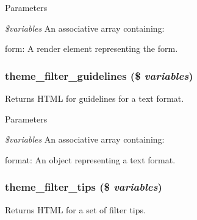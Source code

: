 \begin{DoxyParams}{Parameters}
\item[{\em \$variables}]An associative array containing:
\begin{DoxyItemize}
\item form: A render element representing the form. 
\end{DoxyItemize}\end{DoxyParams}
\hypertarget{group__themeable_ga1c1be7f8ecbe9bff3d03674a3c4e50ed}{
\subsubsection[{theme\_\-filter\_\-guidelines}]{\setlength{\rightskip}{0pt plus 5cm}theme\_\-filter\_\-guidelines (\$ {\em variables})}}
\label{group__themeable_ga1c1be7f8ecbe9bff3d03674a3c4e50ed}
Returns HTML for guidelines for a text format.


\begin{DoxyParams}{Parameters}
\item[{\em \$variables}]An associative array containing:
\begin{DoxyItemize}
\item format: An object representing a text format. 
\end{DoxyItemize}\end{DoxyParams}
\hypertarget{group__themeable_ga573322311613c1d8f1de3ff1eb8a7af8}{
\subsubsection[{theme\_\-filter\_\-tips}]{\setlength{\rightskip}{0pt plus 5cm}theme\_\-filter\_\-tips (\$ {\em variables})}}
\label{group__themeable_ga573322311613c1d8f1de3ff1eb8a7af8}
Returns HTML for a set of filter tips.


